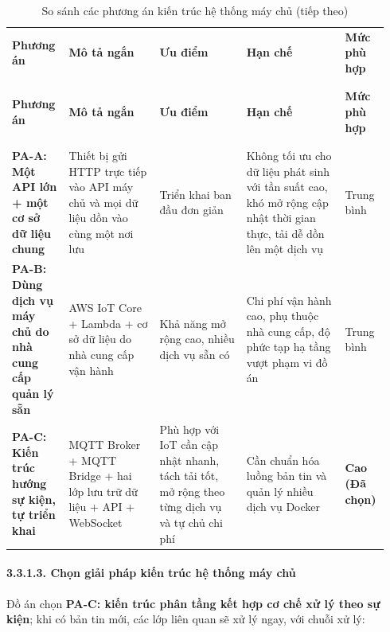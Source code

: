 \documentclass[a4paper]{extarticle}
\newcommand{\thesissettableid}[2]{%
  \renewcommand{\thetable}{#1}%
  \renewcommand{\theHtable}{#2}%
}
\begin{document}
{\thesissettableid{3.15A}{tab-ch3-so-sanh-cac-phuong-an-kien-truc-cloud}
\def\LTcaptype{table}
\begin{longtable}{|L{0.145\linewidth}|L{0.230\linewidth}|L{0.220\linewidth}|L{0.250\linewidth}|L{0.100\linewidth}|}
\caption{So sánh các phương án kiến trúc hệ thống máy chủ}\label{tab:ch3-so-sanh-cac-phuong-an-kien-truc-cloud}\\
\hline \textbf{Phương án} & \textbf{Mô tả ngắn} & \textbf{Ưu điểm} & \textbf{Hạn chế} & \textbf{Mức phù hợp} \\
\\\hline
\endfirsthead
\caption[]{So sánh các phương án kiến trúc hệ thống máy chủ (tiếp theo)}\\
\hline \textbf{Phương án} & \textbf{Mô tả ngắn} & \textbf{Ưu điểm} & \textbf{Hạn chế} & \textbf{Mức phù hợp} \\
\\\hline
\endhead
\\\hline
\endfoot
\endlastfoot
\textbf{PA-A: Một API lớn + một cơ sở dữ liệu chung} & Thiết bị gửi HTTP
trực tiếp vào API máy chủ và mọi dữ liệu dồn vào cùng một nơi lưu &
Triển khai ban đầu đơn giản & Không tối ưu cho dữ liệu phát sinh với tần
suất cao, khó mở rộng cập nhật thời gian thực, tải dễ dồn lên một dịch
vụ & Trung bình \\\hline
\textbf{PA-B: Dùng dịch vụ máy chủ do nhà cung cấp quản lý sẵn} & AWS IoT
Core + Lambda + cơ sở dữ liệu do nhà cung cấp vận hành & Khả năng mở
rộng cao, nhiều dịch vụ sẵn có & Chi phí vận hành cao, phụ thuộc nhà
cung cấp, độ phức tạp hạ tầng vượt phạm vi đồ án & Trung bình \\\hline
\textbf{PA-C: Kiến trúc hướng sự kiện, tự triển khai} & MQTT Broker +
MQTT Bridge + hai lớp lưu trữ dữ liệu + API + WebSocket & Phù hợp với
IoT cần cập nhật nhanh, tách tải tốt, mở rộng theo từng dịch vụ và tự
chủ chi phí & Cần chuẩn hóa luồng bản tin và quản lý nhiều dịch vụ Docker &
\textbf{Cao (Đã chọn)} \\\hline
\end{longtable}
}


\paragraph{3.3.1.3. Chọn giải pháp kiến trúc
hệ thống máy chủ}\label{3133-chux1ecdn-giux1ea3i-phuxe1p-kiux1ebfn-truxfac-cloud}

Đồ án chọn \textbf{PA-C: kiến trúc phân tầng kết hợp cơ chế xử lý theo sự kiện};
khi có bản tin mới, các lớp liên quan sẽ xử lý ngay, với chuỗi xử lý:
\end{document}
